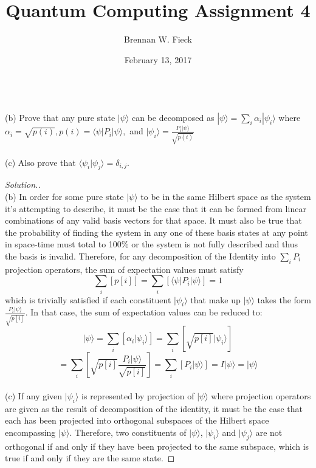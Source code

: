 \documentclass[12pt]{article}
\newenvironment{problem}[2][Problem]{\begin{trivlist}
\item[\hskip \labelsep {\bfseries #1}\hskip \labelsep {\bfseries #2.}]}{\end{trivlist}}
\begin{document}
 
 
\title{Quantum Computing Assignment 4}
\author{Brennan W. Fieck}
\date{February 13, 2017}
\maketitle

\begin{problem}{3.4.1}~\\
\indent (b) Prove that any pure state $|\psi\rangle$ can be decomposed as $|\psi\rangle=\sum_i\alpha_i|\psi_i\rangle$
where $\alpha_i=\sqrt{p(i)},p(i)=\langle\psi|P_i|\psi\rangle,$ and $|\psi_i\rangle=\frac{P_i|\psi\rangle}{\sqrt{p(i)}}$\\~\\
\indent (c) Also prove that $\langle\psi_i|\psi_j\rangle=\delta_{i,j}$.
\end{problem}

\begin{proof}[Solution.]~\\
\indent (b) In order for some pure state $|\psi\rangle$ to be in the same
Hilbert space as the system it's attempting to describe, it must be the case
that it can be formed from linear combinations of any valid basis vectors for
that space. It must also be true that the probability of finding the system in
any one of these basis states at any point in space-time must total to 100\% or
the system is not fully described and thus the basis is invalid. Therefore, for
any decomposition of the Identity into $\sum_iP_i$ projection operators, the sum
of expectation values must satisfy
$$\sum_i[p[i]]=\sum_i\left[\langle\psi|P_i|\psi\rangle\right]=1$$
which is trivially satisfied if each constituent $|\psi_i\rangle$ that make up
$|\psi\rangle$ takes the form $\frac{P_i|\psi\rangle}{\sqrt{p[i]}}$. In that
case, the sum of expectation values can be reduced to:
$$|\psi\rangle=\sum_i[\alpha_i|\psi_i\rangle]=\sum_i\left[\sqrt{p[i]}|\psi_i\rangle\right]$$
$$=\sum_i\left[\sqrt{p[i]}\frac{P_i|\psi\rangle}{\sqrt{p[i]}}\right]=\sum_i\left[P_i|\psi\rangle\right]=I|\psi\rangle=|\psi\rangle$$\\
\indent (c) If any given $|\psi_i\rangle$ is represented by projection of
$|\psi\rangle$ where projection operators are given as the result of
decomposition of the identity, it must be the case that each has been projected
into orthogonal subspaces of the Hilbert space encompassing $|\psi\rangle$.
Therefore, two constituents of $|\psi\rangle$, $|\psi_i\rangle$ and
$|\psi_j\rangle$ are not orthogonal if and only if they have been projected to
the same subspace, which is true if and only if they are the same state.
\end{proof}
\end{document}
